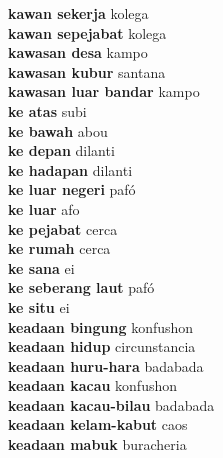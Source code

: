 \textbf{ kawan sekerja  } kolega \\
\textbf{ kawan sepejabat  } kolega \\
\textbf{ kawasan desa  } kampo \\
\textbf{ kawasan kubur  } santana \\
\textbf{ kawasan luar bandar  } kampo \\
\textbf{ ke atas  } subi \\
\textbf{ ke bawah  } abou \\
\textbf{ ke depan  } dilanti \\
\textbf{ ke hadapan  } dilanti \\
\textbf{ ke luar negeri  } pafó \\
\textbf{ ke luar  } afo \\
\textbf{ ke pejabat  } cerca \\
\textbf{ ke rumah  } cerca \\
\textbf{ ke sana  } ei \\
\textbf{ ke seberang laut  } pafó \\
\textbf{ ke situ  } ei \\
\textbf{ keadaan bingung  } konfushon \\
\textbf{ keadaan hidup  } circunstancia \\
\textbf{ keadaan huru-hara  } badabada \\
\textbf{ keadaan kacau  } konfushon \\
\textbf{ keadaan kacau-bilau  } badabada \\
\textbf{ keadaan kelam-kabut  } caos \\
\textbf{ keadaan mabuk  } buracheria \\
